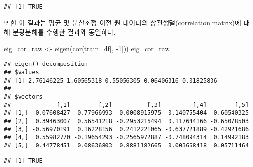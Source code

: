 \documentclass[
]{book}
\newenvironment{Shaded}{\begin{snugshade}}{\end{snugshade}}
\newcommand{\DecValTok}[1]{\textcolor[rgb]{0.00,0.00,0.81}{#1}}
\newcommand{\FunctionTok}[1]{\textcolor[rgb]{0.00,0.00,0.00}{#1}}
\newcommand{\NormalTok}[1]{#1}
\newcommand{\OtherTok}[1]{\textcolor[rgb]{0.56,0.35,0.01}{#1}}
\newcommand{\SpecialCharTok}[1]{\textcolor[rgb]{0.00,0.00,0.00}{#1}}
\begin{document}
\begin{Shaded}
\end{Shaded}

\begin{verbatim}
## [1] TRUE
\end{verbatim}

또한 이 결과는 평균 및 분산조정 이전 원 데이터의 상관행렬(correlation matrix)에 대해 분광분해를 수행한 결과와 동일하다.

\begin{Shaded}
\begin{Highlighting}[]
\NormalTok{eig\_cor\_raw }\OtherTok{\textless{}{-}} \FunctionTok{eigen}\NormalTok{(}\FunctionTok{cor}\NormalTok{(train\_df[, }\SpecialCharTok{{-}}\DecValTok{1}\NormalTok{]))}
\NormalTok{eig\_cor\_raw}
\end{Highlighting}
\end{Shaded}

\begin{verbatim}
## eigen() decomposition
## $values
## [1] 2.76146225 1.60565318 0.55056305 0.06406316 0.01825836
## 
## $vectors
##             [,1]        [,2]          [,3]         [,4]        [,5]
## [1,] -0.07608427  0.77966993  0.0008915975 -0.140755404  0.60540325
## [2,]  0.39463007  0.56541218 -0.2953216494  0.117644166 -0.65078503
## [3,] -0.56970191  0.16228156  0.2412221065 -0.637721889 -0.42921686
## [4,]  0.55982770 -0.19654293 -0.2565972887 -0.748094314  0.14992183
## [5,]  0.44778451  0.08636803  0.8881182665 -0.003668418 -0.05711464
\end{verbatim}

\begin{Shaded}
\end{Shaded}

\begin{verbatim}
## [1] TRUE
\end{verbatim}
\end{document}
